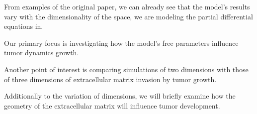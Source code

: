 From examples of the original paper, we can already see that the model's results vary with the dimensionality of the space, we are modeling the partial differential equations in. 

Our primary focus is investigating how the model's free parameters influence tumor dynamics growth.  

Another point of interest is comparing simulations of two dimensions with those of three dimensions of extracellular matrix invasion by tumor growth. 

Additionally to the variation of dimensions, we will briefly examine how the geometry of the extracellular matrix will influence tumor development.